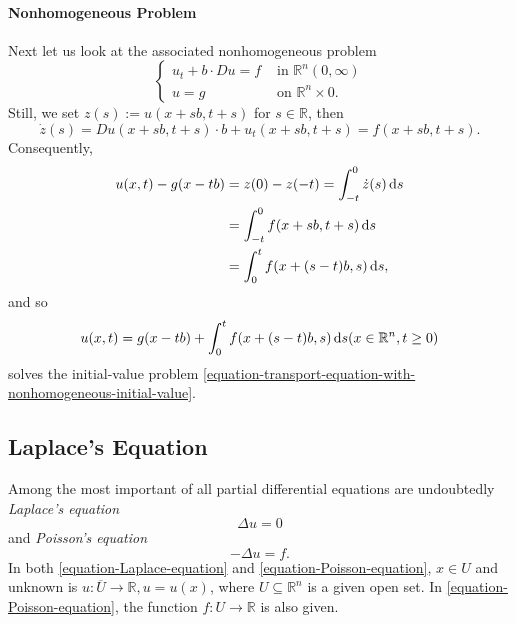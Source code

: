 \paragraph{Nonhomogeneous Problem}
Next let us look at the associated nonhomogeneous problem
\begin{equation}
  \begin{cases}
  u_t + b \cdot Du = f & \text{ in } \mathbb{R}^n (0, \infty)\\
  u = g &  \text{ on } \mathbb{R}^n \times 0.
  \end{cases}
  \label{equation-transport-equation-with-nonhomogeneous-initial-value}
\end{equation}
Still, we set \( z(s) := u(x + sb, t + s) \) for \( s \in \mathbb{R} \), then
\[
  \dot{z}(s) = Du(x + sb, t + s) \cdot b + u_t(x + sb, t + s) = f(x + sb, t + s).
\]
Consequently,
\begin{align*}
  u(x, t) - g(x - tb) &= z(0) - z(-t) = \int_{-t}^{0}\dot{z}(s) \mathop{}\!\mathrm{d} s\\
                      &= \int_{-t}^{0} f(x + sb, t + s) \mathop{}\!\mathrm{d} s\\
                      &= \int_0^{t} f(x + (s - t) b, s) \mathop{}\!\mathrm{d} s,
\end{align*}
and so
\begin{equation}
  u(x, t) = g(x - tb) + \int_0^t f(x + (s - t)b , s) \mathop{}\!\mathrm{d} s (x \in \mathbb{R}^n, t \geq 0)
  \label{equation-solution-transport-equation-with-nonhomogeneous-initial-value}
\end{equation}
solves the initial-value problem \eqref{equation-transport-equation-with-nonhomogeneous-initial-value}.

\subsection{Laplace's Equation}
\label{subsection-Laplace-equation}

Among the most important of all partial differential equations are undoubtedly \emph{Laplace's equation}
\begin{equation}
  \Delta u = 0
  \label{equation-Laplace-equation}
\end{equation}
and \emph{Poisson's equation}
\begin{equation}
  - \Delta u = f.
  \label{equation-Poisson-equation}
\end{equation}
In both \eqref{equation-Laplace-equation} and \eqref{equation-Poisson-equation}, \( x \in U \) and unknown is \( u: \overline{U} \to \mathbb{R}, u = u(x) \), where \( U \subseteq \mathbb{R}^n \) is a given open set.
In \eqref{equation-Poisson-equation}, the function \( f: U \to \mathbb{R} \) is also given.

